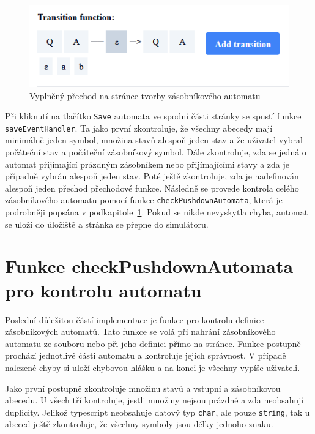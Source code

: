 \begin{figure}[h]
    \centering
    \includegraphics{Figures/PrntScrn_FilledTransition.png}
    \caption{Vyplněný přechod na stránce tvorby zásobníkového automatu}\label{fig:FilledTransition}
\end{figure}

Při kliknutí na tlačítko \texttt{Save} automata ve spodní části stránky se spustí funkce \texttt{saveEventHandler}. Ta jako první zkontroluje, že všechny abecedy mají minimálně jeden symbol, množina stavů alespoň jeden stav a že uživatel vybral počáteční stav a počáteční zásobníkový symbol. Dále zkontroluje, zda se jedná o automat přijímající prázdným zásobníkem nebo přijímajícími stavy a zda je případně vybrán alespoň jeden stav. Poté ještě zkontroluje, zda je nadefinován alespoň jeden přechod přechodové funkce. Následně se provede kontrola celého zásobníkového automatu pomocí funkce \texttt{checkPushdownAutomata}, která je podrobněji popsána v podkapitole~\ref{sec:checkPushdownAutomata}. Pokud se nikde nevyskytla chyba, automat se uloží do úložiště a stránka se přepne do simulátoru.

\section{Funkce checkPushdownAutomata pro kontrolu automatu}\label{sec:checkPushdownAutomata}

Poslední důležitou částí implementace je funkce pro kontrolu definice zásobníkových automatů. Tato funkce se volá při nahrání zásobníkového automatu ze souboru nebo při jeho definici přímo na stránce. Funkce postupně prochází jednotlivé části automatu a kontroluje jejich správnost. V případě nalezené chyby si uloží chybovou hlášku a na konci je všechny vypíše uživateli.

Jako první postupně zkontroluje množinu stavů a vstupní a zásobníkovou abecedu. U všech tří kontroluje, jestli množiny nejsou prázdné a zda neobsahují duplicity. Jelikož typescript neobsahuje datový typ \texttt{char}, ale pouze \texttt{string}, tak u abeced ještě zkontroluje, že všechny symboly jsou délky jednoho znaku.

